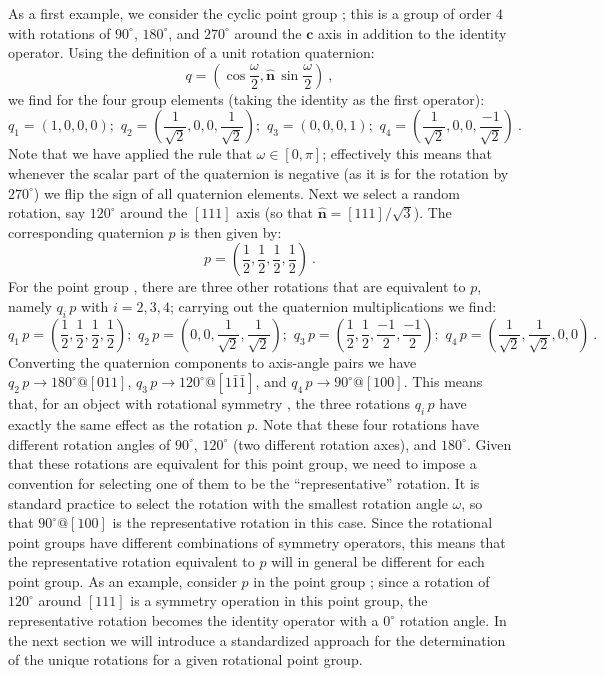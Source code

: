 As a first example, we consider the cyclic point group ; this is a group of order $4$ with rotations of $90^{\circ}$, $180^{\circ}$, and $270^{\circ}$ around the $\mathbf{c}$ axis in addition to the identity operator. Using the definition of a unit rotation quaternion:
\[
	q = \left( \cos\frac{\omega}{2}, \hat{\mathbf{n}}\,\sin\frac{\omega}{2}\right)\ ,
\]
we find for the four group elements (taking the identity as the first operator):
{\small\[
	q_1=\left(1, 0, 0, 0\right);\,\, q_2=\left(\frac{1}{\sqrt{2}}, 0, 0,\frac{1}{\sqrt{2}}\right);\,\, q_3=\left(0, 0, 0, 1\right);\,\, q_4=\left(\frac{1}{\sqrt{2}}, 0, 0, \frac{-1}{\sqrt{2}}\right)\ .
\]}
Note that we have applied the rule that $\omega\in[0,\pi]$; effectively this means that whenever the scalar part of the quaternion is negative (as it is for the rotation by $270^{\circ}$) we flip the sign of all quaternion elements.  Next we select a random rotation, say $120^{\circ}$ around the $[111]$ axis (so that $\hat{\mathbf{n}}=[111]/\sqrt{3}$).  The corresponding quaternion $p$ is then given by:
\[
	p = \left(\frac{1}{2},\frac{1}{2},\frac{1}{2},\frac{1}{2}\right)\ .
\]
For the point group , there are three other rotations that are equivalent to $p$, namely $q_i\,p$ with $i=2,3,4$; carrying out the quaternion multiplications we find:
{\small\[
	q_1\,p=\left(\frac{1}{2},\frac{1}{2},\frac{1}{2},\frac{1}{2}\right);\,\, q_2\,p=\left( 0, 0,\frac{1}{\sqrt{2}},\frac{1}{\sqrt{2}}\right);\,\, q_3\,p=\left(\frac{1}{2},\frac{1}{2},\frac{-1}{2},\frac{-1}{2}\right);\,\, q_4\,p=\left(\frac{1}{\sqrt{2}}, \frac{1}{\sqrt{2}}, 0, 0\right)\ .
\]}
Converting the quaternion components to axis-angle pairs we have $q_2\,p\rightarrow 180^{\circ}@[011]$, $q_3\,p\rightarrow 120^{\circ}@[1\bar{1}\bar{1}]$, and $q_4\,p\rightarrow 90^{\circ}@[100]$.  This means that, for an object with rotational symmetry ,  the three rotations $q_i\,p$ have exactly the same effect as
 the rotation $p$.  Note that these four rotations have different rotation angles of $90^{\circ}$, $120^{\circ}$ (two different rotation axes), and $180^{\circ}$. Given that these rotations are equivalent for this point group, we need to impose a convention for selecting one of them to be the ``representative'' rotation. It is standard practice to select the rotation with the smallest rotation angle $\omega$, so that $90^{\circ}@[100]$ is the representative rotation in this case. Since the rotational point groups have different combinations of symmetry operators, this means that the representative rotation equivalent to $p$ will in general be different for each point group. As an example, consider $p$ in the point group ; since a rotation of $120^{\circ}$ around $[111]$ is a symmetry operation in this point group, the representative rotation becomes the identity operator with a $0^{\circ}$ rotation angle. In the next section we will introduce a standardized approach for the determination of the unique rotations for a given rotational point group.
 

